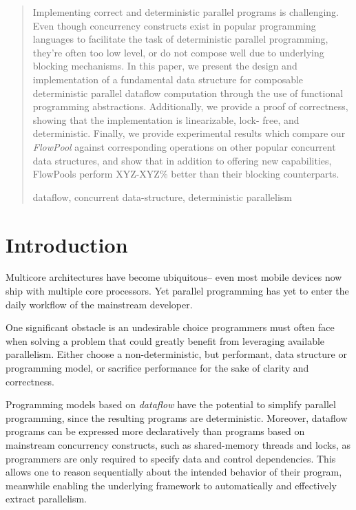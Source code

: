 \documentclass[runningheads,a4paper]{llncs}
\newcommand{\keywords}[1]{\par\addvspace\baselineskip
\noindent\keywordname\enspace\ignorespaces#1}
\begin{document}
\begin{abstract}
Implementing correct and deterministic parallel programs is challenging. Even
though concurrency constructs exist in popular programming languages to
facilitate the task of deterministic parallel programming, they're often too
low level, or do not compose well due to underlying blocking mechanisms. In
this paper, we present the design and implementation of a fundamental data
structure for composable deterministic parallel dataflow computation through
the use of functional programming abstractions. Additionally, we provide a
proof of correctness, showing that the implementation is linearizable, lock-
free, and deterministic. Finally, we provide experimental results which
compare our \emph{FlowPool} against corresponding operations on other popular
concurrent data structures, and show that in addition to offering new
capabilities, FlowPools perform XYZ-XYZ\% better than their blocking counterparts.
\keywords{dataflow, concurrent data-structure, deterministic parallelism}
\end{abstract}


\section{Introduction}

Multicore architectures have become ubiquitous-- even most mobile devices now
ship with multiple core processors. Yet parallel programming has yet to enter
the daily workflow of the mainstream developer.  


One significant obstacle is an undesirable choice programmers must often face
when solving a problem that could greatly benefit from leveraging available
parallelism. Either choose a non-deterministic, but performant, data structure
or programming model, or sacrifice performance for the sake of clarity and
correctness.


Programming models based on \emph{dataflow} have the potential to simplify
parallel programming, since the resulting programs are deterministic.
Moreover, dataflow programs can be expressed more declaratively than programs
based on mainstream concurrency constructs, such as shared-memory threads and
locks, as programmers are only required to specify data and control
dependencies. This allows one to reason sequentially about the intended
behavior of their program, meanwhile enabling the underlying framework to
automatically and effectively extract parallelism.
\end{document}
